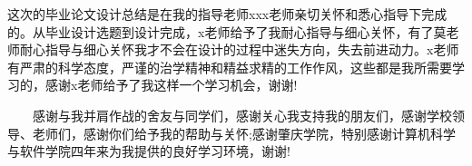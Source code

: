 \documentclass[bachelor,nocolorlinks, printoneside]{seuthesis} %
\begin{document}
\begin{Acknowledgement}{}
这次的毕业论文设计总结是在我的指导老师xxx老师亲切关怀和悉心指导下完成的。从毕业设计选题到设计完成，x老师给予了我耐心指导与细心关怀，有了莫老师耐心指导与细心关怀我才不会在设计的过程中迷失方向，失去前进动力。x老师有严肃的科学态度，严谨的治学精神和精益求精的工作作风，这些都是我所需要学习的，感谢x老师给予了我这样一个学习机会，谢谢!

　　感谢与我并肩作战的舍友与同学们，感谢关心我支持我的朋友们，感谢学校领导、老师们，感谢你们给予我的帮助与关怀;感谢肇庆学院，特别感谢计算机科学与软件学院四年来为我提供的良好学习环境，谢谢!
\end{Acknowledgement}




\newpage
\printindex %



%
%
\end{document}
